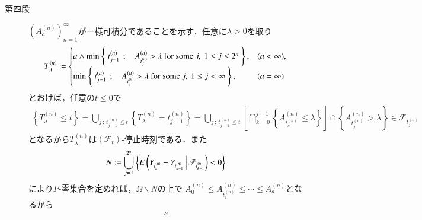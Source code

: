 \begin{prf}
\begin{description}
			\item[第四段]
				$\left( A^{(n)}_a \right)_{n=1}^\infty$が一様可積分であることを示す．任意に$\lambda > 0$を取り
				\begin{align}
					T_\lambda^{(n)} \coloneqq
					\begin{cases}
						a \wedge \operatorname*{min}_{} \left\{\ t^{(n)}_{j-1}\ \, ; \quad A^{(n)}_{t^{(n)}_j} > \lambda \mbox{ for some } j,\ 1 \leq j \leq 2^n\ \right\}, & (a < \infty), \\
						\operatorname*{min}_{} \left\{\ t^{(n)}_{j-1}\ \, ; \quad A^{(n)}_{t^{(n)}_j} > \lambda \mbox{ for some } j,\ 1 \leq j < \infty\ \right\}, & (a=\infty)
					\end{cases}
				\end{align}
				とおけば，任意の$t \leq 0$で
				\begin{align}
					\left\{ T_\lambda^{(n)} \leq t \right\}
					= \bigcup_{j\, :\, t^{(n)}_{j-1} \leq t} \left\{ T_\lambda^{(n)} = t^{(n)}_{j-1} \right\}
					= \bigcup_{j\, :\, t^{(n)}_{j-1} \leq t}
						\left[ \bigcap_{k=0}^{j-1} \left\{ A^{(n)}_{t^{(n)}_k} \leq \lambda \right\} \right] 
						\cap \left\{ A^{(n)}_{t^{(n)}_j} > \lambda \right\}
					\in \mathscr{F}_{t^{(n)}_j}
				\end{align}
				となるから$T_\lambda^{(n)}$は$(\mathscr{F}_t)$-停止時刻である．また
				\begin{align}
					N \coloneqq \bigcup_{j=1}^{2^n} \left\{ E\left( Y_{t^{(n)}_k} - Y_{t^{(n)}_{k-1}} \, \middle|\, \mathscr{F}_{t^{(n)}_{k-1}} \right) < 0 \right\}
				\end{align}
				により$P$-零集合を定めれば，$\Omega \backslash N$の上で
				$A^{(n)}_0 \leq A^{(n)}_{t^{(n)}_1} \leq \cdots \leq A^{(n)}_a$となるから
				\begin{align}
					s
				\end{align}
				

\end{description}
\end{prf}
